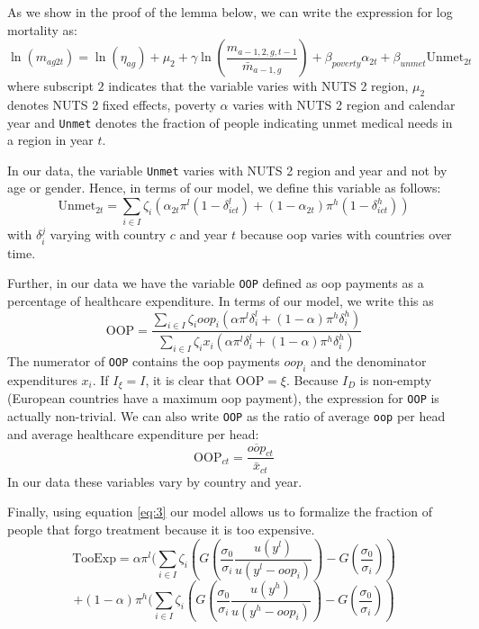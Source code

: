 \documentclass[a4paper,12pt]{article}
\begin{document}
As we show in the proof of the lemma below, we can write the expression for log mortality as:
\begin{equation}
\label{eq:health2}
\ln(m_{ag2t}) =\ln ( \eta_{ag}) + \mu_2 + \gamma \ln \left( \frac{m_{a-1,2,g,t-1}}{\bar m_{a-1,g}}\right) + \beta_{poverty}\alpha_{2t} + \beta_{unmet}\text{Unmet}_{2t}
\end{equation}
where subscript \(2\) indicates that the variable varies with NUTS 2 region, \(\mu_2\) denotes NUTS 2 fixed effects, poverty \(\alpha\) varies with NUTS 2 region and calendar year and \texttt{Unmet} denotes the fraction of people indicating unmet medical needs in a region in year \(t\). 

In our data, the variable \texttt{Unmet} varies with NUTS 2 region and year and not by age or gender. Hence, in terms of our model, we define this variable as follows:
\begin{equation}
\label{eq:Unmet}
\text{Unmet}_{2t} = \sum_{i \in I} \zeta_i (\alpha_{2t} \pi^l (1-\delta^l_{ict}) + (1-\alpha_{2t}) \pi^h (1-\delta^h_{ict}))
\end{equation}
with \(\delta^j_i\) varying with country \(c\) and year \(t\) because oop varies with countries over time.

Further, in our data we have the variable \texttt{OOP}  defined as oop payments as a percentage of healthcare expenditure. In terms of our model, we write this as
\begin{equation}
\label{eq:OOP}
\text{OOP} = \frac{\sum_{i \in I} \zeta_i oop_i (\alpha \pi^l \delta^l_i + (1-\alpha) \pi^h \delta^h_i)}{\sum_{i \in I} \zeta_i x_i (\alpha \pi^l \delta_i^l + (1-\alpha) \pi^h \delta_i^h) }
\end{equation}
The numerator of \texttt{OOP} contains the oop payments \(oop_{i}\) and the denominator expenditures \(x_i\). If \(I_{\xi} = I\), it is clear that \(\text{OOP} = \xi\). Because \(I_D\) is non-empty (European countries have a maximum oop payment), the expression for \texttt{OOP} is actually non-trivial. We can also write \texttt{OOP} as the ratio of average \texttt{oop} per head and average healthcare expenditure per head:
\begin{equation}
\label{eq:OOP2}
\text{OOP}_{ct} = \frac{\overline{oop}_{ct}}{\bar{x}_{ct}}
\end{equation}
In our data these variables vary by country and year.

Finally, using equation \eqref{eq:3} our model allows us to formalize the fraction of people that forgo treatment because it is too expensive.
\begin{equation}
\label{eq:TooExp}
\text{TooExp} = \alpha \pi^l (\sum_{i \in I}\zeta_{i} \left(G\left( \frac{\sigma_0}{\sigma_i} \frac{u(y^{l})}{u(y^{l}-oop_{i})} \right) - G\left( \frac{\sigma_0}{\sigma_i} \right) \right )
\end{equation}
\begin{equation*}
 + (1-\alpha) \pi^h (\sum_{i \in I}\zeta_{i} \left(G\left( \frac{\sigma_0}{\sigma_i} \frac{u(y^{h})}{u(y^{h}-oop_{i})} \right) - G\left( \frac{\sigma_0}{\sigma_i} \right) \right )
\end{equation*}
\end{document}
